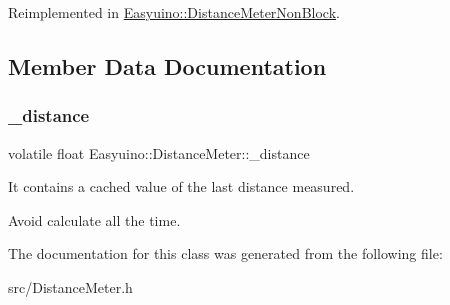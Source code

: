 Reimplemented in \hyperlink{class_easyuino_1_1_distance_meter_non_block_a4ea37c6c0562a76cd03636db329743f9}{Easyuino\+::\+Distance\+Meter\+Non\+Block}.



\subsection{Member Data Documentation}
\mbox{\label{class_easyuino_1_1_distance_meter_ae10df1a21d2acfec3aa3eef57ea3a632}} 
\subsubsection{\texorpdfstring{\+\_\+distance}{\_distance}}
{\footnotesize\ttfamily volatile float Easyuino\+::\+Distance\+Meter\+::\+\_\+distance\hspace{0.3cm}{\ttfamily [protected]}}



It contains a cached value of the last distance measured. 

Avoid calculate all the time. 

The documentation for this class was generated from the following file\+:\begin{DoxyCompactItemize}
\item 
src/Distance\+Meter.\+h\end{DoxyCompactItemize}
